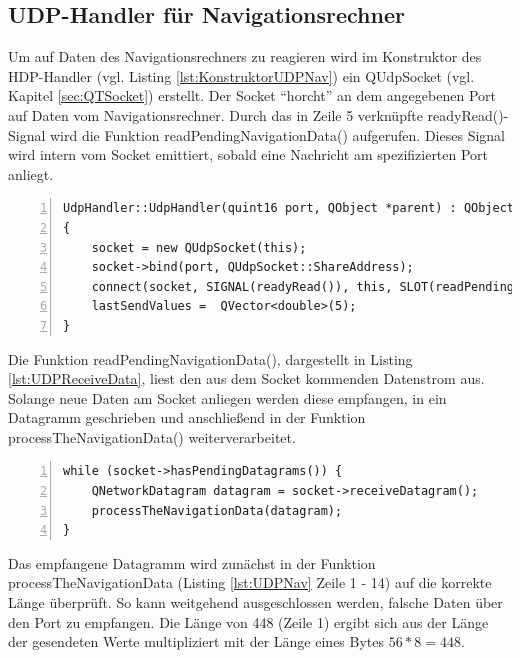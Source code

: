 \subsection{UDP-Handler für Navigationsrechner}

Um auf Daten des Navigationsrechners zu reagieren wird im Konstruktor des HDP-Handler (vgl. Listing \ref{lst:KonstruktorUDPNav}) ein QUdpSocket (vgl. Kapitel \ref{sec:QTSocket}) erstellt. Der Socket "`horcht"' an dem angegebenen Port auf Daten vom Navigationsrechner. Durch das in Zeile 5 verknüpfte readyRead()-Signal wird die Funktion readPendingNavigationData() aufgerufen. Dieses Signal wird intern vom Socket emittiert, sobald eine Nachricht am spezifizierten Port anliegt. 

\begin{lstlisting}[frame=single, breaklines=true, numbers=left, stepnumber=2, firstnumber=1, numberstyle = \tiny, caption=UDP-Handler Konstruktor für Navigationsdatenaustausch,label=lst:KonstruktorUDPNav]
UdpHandler::UdpHandler(quint16 port, QObject *parent) : QObject(parent)
{
    socket = new QUdpSocket(this);
    socket->bind(port, QUdpSocket::ShareAddress);
    connect(socket, SIGNAL(readyRead()), this, SLOT(readPendingNavigationData()));
    lastSendValues =  QVector<double>(5);
}
\end{lstlisting}

Die Funktion readPendingNavigationData(), dargestellt in Listing \ref{lst:UDPReceiveData}, liest den aus dem Socket kommenden Datenstrom aus. Solange neue Daten am Socket anliegen werden diese empfangen, in ein Datagramm geschrieben und anschließend in der Funktion processTheNavigationData() weiterverarbeitet. 

\begin{lstlisting}[frame=single, breaklines=true, numbers=left, stepnumber=2, firstnumber=1, numberstyle = \tiny, caption=Daten über UDP empfangen,label=lst:UDPReceiveData]
while (socket->hasPendingDatagrams()) {
    QNetworkDatagram datagram = socket->receiveDatagram();
    processTheNavigationData(datagram);
}
\end{lstlisting}

Das empfangene Datagramm wird zunächst in der Funktion processTheNavigationData (Listing \ref{lst:UDPNav} Zeile 1 - 14) auf die korrekte Länge überprüft. So kann weitgehend ausgeschlossen werden, falsche Daten über den Port zu empfangen. Die Länge von 448 (Zeile 1) ergibt sich aus der Länge der gesendeten Werte multipliziert mit der Länge eines Bytes $56 * 8 = 448$. 


